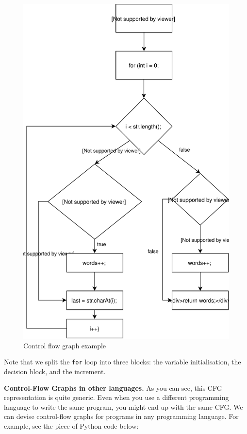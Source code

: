 \begin{figure}
\centering
\includegraphics{img/structural-testing/examples/CFG-branch-example.svg}
\caption{Control flow graph example}
\end{figure}

Note that we split the \texttt{for} loop into three blocks: the variable
initialisation, the decision block, and the increment.

\textbf{Control-Flow Graphs in other languages.} As you can see, this
CFG representation is quite generic. Even when you use a different
programming language to write the same program, you might end up with
the same CFG. We can devise control-flow graphs for programs in any
programming language. For example, see the piece of Python code below:

